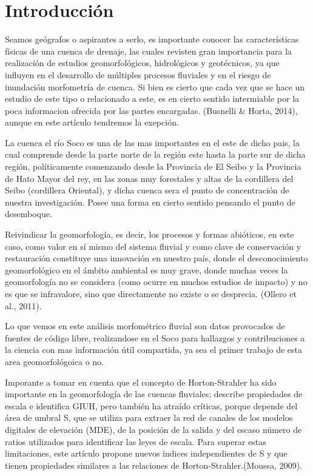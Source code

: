 \documentclass[11pt,]{article}
\begin{document}
\vskip 6.5pt


\noindent  \section{Introducción}\label{introducciuxf3n}

Seamos geógrafos o aspirantes a serlo, es importante conocer las
características físicas de una cuenca de drenaje, las cuales revisten
gran importancia para la realización de estudios geomorfológicos,
hidrológicos y geotécnicos, ya que influyen en el desarrollo de
múltiples procesos fluviales y en el riesgo de inundación morfometría de
cuenca. Si bien es cierto que cada vez que se hace un estudio de este
tipo o relacionado a este, es en cierto sentido intermiable por la poca
informacion ofrecida por las partes encargadas. (Busnelli \& Horta,
2014), aunque en este artículo tendremos la exepción.

La cuenca el río Soco es una de las mas importantes en el este de dicho
pais, la cual comprende desde la parte norte de la región este hasta la
parte sur de dicha región, políticamente comenzando desde la Provincia
de El Seibo y la Provincia de Hato Mayor del rey, en las zonas muy
forestales y altas de la cordillera del Seibo (cordillera Oriental), y
dicha cuenca sera el punto de concentración de nuestra investigación.
Posee una forma en cierto sentido pensando el punto de desemboque.

Reivindicar la geomorfología, es decir, los procesos y formas abióticos,
en este caso, como valor en sí mismo del sistema fluvial y como clave de
conservación y restauración constituye una innovación en nuestro país,
donde el desconocimiento geomorfológico en el ámbito ambiental es muy
grave, donde muchas veces la geomorfología no se considera (como ocurre
en muchos estudios de impacto) y no es que se infravalore, sino que
directamente no existe o se desprecia. (Ollero et al., 2011).

Lo que vemos en este análisis morfométrico fluvial son datos provocados
de fuentes de código libre, realizandose en el Soco para hallazgos y
contribuciones a la ciencia con mas información útil compartida, ya sea
el primer trabajo de esta area geomorfológoica o no.

Imporante a tomar en cuenta que el concepto de Horton-Strahler ha sido
importante en la geomorfología de las cuencas fluviales; describe
propiedades de escala e identifica GIUH, pero también ha atraído
críticas, porque depende del área de umbral S, que se utiliza para
extraer la red de canales de los modelos digitales de elevación (MDE),
de la posición de la salida y del escaso número de ratios utilizados
para identificar las leyes de escala. Para superar estas limitaciones,
este artículo propone nuevos índices independientes de S y que tienen
propiedades similares a las relaciones de Horton-Strahler.(Moussa,
2009).
\end{document}
